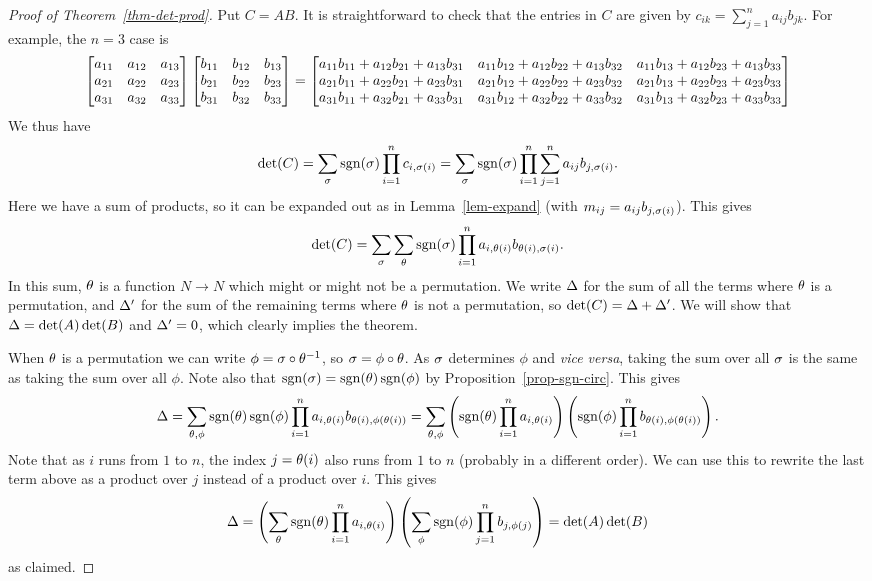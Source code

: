 \documentclass[reqno]{amsart}
\theoremstyle{definition}
\begin{document}
\begin{proof}[Proof of Theorem~\ref{thm-det-prod}]
 Put $C=AB$.  It is straightforward to check that the entries in $C$ are
 given by $c_{ik}=\sum_{j=1}^na_{ij}b_{jk}$.  For example, the $n=3$
 case is
 \[ \left[\begin{matrix}
     a_{11}&a_{12}&a_{13} \\ a_{21}&a_{22}&a_{23} \\ a_{31}&a_{32}&a_{33}
    \end{matrix}\right]
    \left[\begin{matrix}
     b_{11}&b_{12}&b_{13} \\ b_{21}&b_{22}&b_{23} \\ b_{31}&b_{32}&b_{33}
    \end{matrix}\right]
    =
    \left[\begin{matrix}
     a_{11}b_{11} + a_{12}b_{21} + a_{13}b_{31} &
     a_{11}b_{12} + a_{12}b_{22} + a_{13}b_{32} &
     a_{11}b_{13} + a_{12}b_{23} + a_{13}b_{33} \\
     a_{21}b_{11} + a_{22}b_{21} + a_{23}b_{31} &
     a_{21}b_{12} + a_{22}b_{22} + a_{23}b_{32} &
     a_{21}b_{13} + a_{22}b_{23} + a_{23}b_{33} \\
     a_{31}b_{11} + a_{32}b_{21} + a_{33}b_{31} &
     a_{31}b_{12} + a_{32}b_{22} + a_{33}b_{32} &
     a_{31}b_{13} + a_{32}b_{23} + a_{33}b_{33}
    \end{matrix}\right]
 \]
 We thus have
 \[ \det(C) =
     \sum_\sigma \operatorname{sgn}(\sigma)\prod_{i=1}^n c_{i,\sigma(i)} =
     \sum_\sigma \operatorname{sgn}(\sigma)\prod_{i=1}^n \sum_{j=1}^n a_{ij}b_{j,\sigma(i)}.
 \]
 Here we have a sum of products, so it can be expanded out as in
 Lemma~\ref{lem-expand} (with $m_{ij}=a_{ij}b_{j,\sigma(i)}$).  This
 gives
 \[ \det(C) =
     \sum_\sigma \sum_\theta \operatorname{sgn}(\sigma)\prod_{i=1}^n a_{i,\theta(i)}b_{\theta(i),\sigma(i)}.
 \]
 In this sum, $\theta$ is a function $N\to N$ which might or might not
 be a permutation.  We write $\Delta$ for the sum of all the terms where
 $\theta$ is a permutation, and $\Delta'$ for the sum of the remaining
 terms where $\theta$ is not a permutation, so $\det(C)=\Delta+\Delta'$.  We
 will show that $\Delta=\det(A)\det(B)$ and $\Delta'=0$, which clearly
 implies the theorem.

 When $\theta$ is a permutation we can write $\phi=\sigma\circ\theta^{-1}$,
 so $\sigma=\phi\circ\theta$.  As $\sigma$ determines $\phi$ and \emph{vice
  versa}, taking the sum over all $\sigma$ is the same as taking the sum
 over all $\phi$.  Note also that $\operatorname{sgn}(\sigma)=\operatorname{sgn}(\theta)\operatorname{sgn}(\phi)$ by
 Proposition~\ref{prop-sgn-circ}.  This gives
 \[ \Delta = \sum_{\theta,\phi}
           \operatorname{sgn}(\theta)\operatorname{sgn}(\phi)
            \prod_{i=1}^n a_{i,\theta(i)}b_{\theta(i),\phi(\theta(i))}
        = \sum_{\theta,\phi}
           \left(\operatorname{sgn}(\theta)\prod_{i=1}^na_{i,\theta(i)}\right)
           \left(\operatorname{sgn}(\phi)\prod_{i=1}^nb_{\theta(i),\phi(\theta(i))}\right).
 \]
 Note that as $i$ runs from $1$ to $n$, the index $j=\theta(i)$ also
 runs from $1$ to $n$ (probably in a different order).  We can use
 this to rewrite the last term above as a product over $j$ instead of
 a product over $i$.  This gives
 \[ \Delta =  \left(\sum_\theta\operatorname{sgn}(\theta)\prod_{i=1}^na_{i,\theta(i)}\right)
           \left(\sum_\phi\operatorname{sgn}(\phi)\prod_{j=1}^nb_{j,\phi(j)}\right)
        = \det(A)\det(B)
 \]
 as claimed.


\end{proof}
\end{document}

